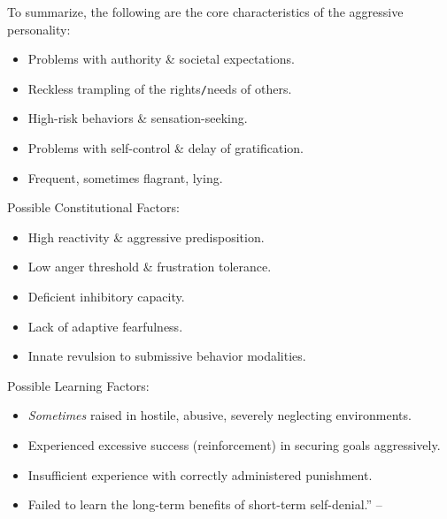 \documentclass{article}
\numberwithin{equation}{section}
\begin{document}
To summarize, the following are the core characteristics of the aggressive personality:
\begin{itemize}
    \item Problems with authority \& societal expectations.
    \item Reckless trampling of the rights\texttt{/}needs of others.
    \item High-risk behaviors \& sensation-seeking.
    \item Problems with self-control \& delay of gratification.
    \item Frequent, sometimes flagrant, lying.
\end{itemize}
Possible Constitutional Factors:
\begin{itemize}
	\item High reactivity \& aggressive predisposition.
	\item Low anger threshold \& frustration tolerance.
	\item Deficient inhibitory capacity.
	\item Lack of adaptive fearfulness.
	\item Innate revulsion to submissive behavior modalities.
\end{itemize}
Possible Learning Factors:
\begin{itemize}
	\item \textit{Sometimes} raised in hostile, abusive, severely neglecting environments.
	\item Experienced excessive success (reinforcement) in securing goals aggressively.
	\item Insufficient experience with correctly administered punishment.
	\item Failed to learn the long-term benefits of short-term self-denial.'' -- \cite[pp. 99--100]{Simon2011}
\end{itemize}
\end{document}
